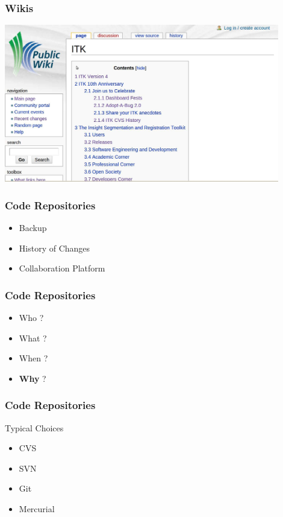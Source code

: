 \documentclass[18pt]{beamer}
\begin{document}
{
\begin{frame}
\frametitle{Wikis}
\includegraphics[width=0.9\textwidth,height=0.9\paperheight]{../Art/ITKWikiScreenShot.jpg}
\end{frame}
}




\begin{frame}
\frametitle{Code Repositories}
\Huge
\begin{itemize}
\item Backup
\pause
\item History of Changes
\pause
\item Collaboration Platform
\end{itemize}
\end{frame}


\begin{frame}
\frametitle{Code Repositories}
\Huge
\begin{itemize}
\item Who ?
\pause
\item What ?
\pause
\item When ?
\pause
\item \textbf{Why} ?
\end{itemize}
\end{frame}


\begin{frame}
\frametitle{Code Repositories}
\Huge
Typical Choices
\begin{itemize}
\item CVS
\pause
\item SVN
\pause
\item Git
\pause
\item Mercurial
\end{itemize}
\end{frame}
\end{document}
